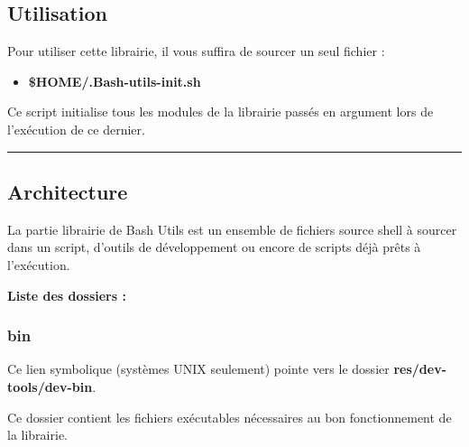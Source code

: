 \documentclass[a4paper,10pt]{article}
\begin{document}
\subsection{Utilisation}\color{white}

\begin{justify}
    Pour utiliser cette librairie, il vous suffira de sourcer un seul fichier :

    \begin{itemize}
        \item \textbf{\color{orange}\$HOME\color{lime}/.Bash-utils-init.sh}
    \end{itemize}
\end{justify}

\begin{justify}
    Ce script initialise tous les modules de la librairie passés en argument lors de l'exécution de ce dernier.
\end{justify}




\color{green}\par\noindent\rule{\textwidth}{0.4pt}\color{white}

\color{green}
\subsection{Architecture}\color{white}

\begin{justify}
    La partie librairie de Bash Utils est un ensemble de fichiers source shell à sourcer dans un script, d'outils de développement ou encore de scripts déjà prêts à l'exécution.
\end{justify}


\textbf{Liste des dossiers :}

\color{blue}
\subsubsection{bin}\color{white}

\begin{justify}
    Ce lien symbolique (systèmes UNIX seulement) pointe vers le dossier \textbf{\color{lime}res/dev-tools/dev-bin}.
\end{justify}

\begin{justify}
    Ce dossier contient les fichiers exécutables nécessaires au bon fonctionnement de la librairie.
\end{justify}
\end{document}
